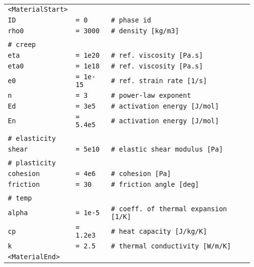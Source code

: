 \documentclass[a4paper,11pt]{article}
\begin{document}
\begin{tabular}{l l l}
\small
\indent \texttt{<MaterialStart>}&&\\
\indent \indent \texttt{ID}&\texttt{= 0}&\texttt{\# phase id}\\
\indent \indent \texttt{rho0 }&\texttt{= 3000}&\texttt{\# density [kg/m3]}\\
&&\\
\indent \indent \texttt{\# creep}&&\\
\indent \indent \texttt{eta  }&\texttt{= 1e20}&\texttt{\# 	ref. viscosity [Pa.s]}\\
\indent \indent \texttt{eta0 }&\texttt{= 1e18}&\texttt{\# 	ref. viscosity [Pa.s]}\\
\indent \indent \texttt{e0 }&\texttt{= 1e-15}&\texttt{\# ref. strain rate [1/s]}\\
\indent \indent \texttt{n }&\texttt{= 3}&\texttt{\# power-law exponent}\\
\indent \indent \texttt{Ed}&\texttt{= 3e5}&\texttt{\# activation energy [J/mol]}\\
\indent \indent \texttt{En}&\texttt{= 5.4e5}&\texttt{\# activation energy [J/mol]}\\
&&\\
\indent \indent \texttt{\# elasticity}&&\\
\indent \indent \texttt{shear }&\texttt{= 5e10}&\texttt{\# elastic shear modulus [Pa]}\\
&&\\
\indent \indent \texttt{\# plasticity}&&\\
\indent \indent \texttt{cohesion }&\texttt{= 4e6}&\texttt{\# cohesion [Pa]}\\
\indent \indent \texttt{friction }&\texttt{= 30}&\texttt{\# friction angle [deg]}\\
&&\\
\indent \indent \texttt{\# temp}&&\\
\indent \indent \texttt{alpha }&\texttt{= 1e-5}&\texttt{\# coeff. of thermal expansion [1/K]}\\
\indent \indent \texttt{cp }&\texttt{= 1.2e3}&\texttt{\# heat capacity [J/kg/K]}\\
\indent \indent \texttt{k }&\texttt{= 2.5}&\texttt{\# thermal conductivity [W/m/K]}\\
\indent \texttt{<MaterialEnd>}\\
\end{tabular}\\

\end{document}
